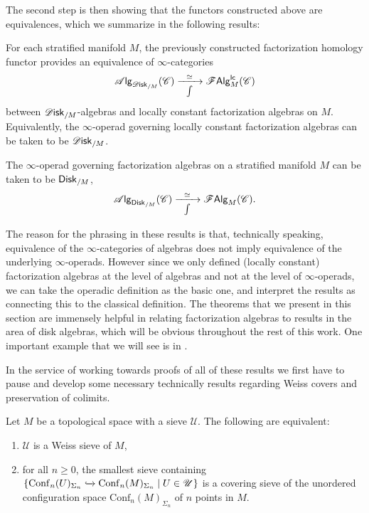 \documentclass[../text]{subfiles}
\begin{document}
The second step is then showing that the functors constructed above are equivalences, which we summarize in the following results:
%
\begin{theorem}\label{thm:disk_alg=lcfa}
    For each stratified manifold $M$, the previously constructed factorization homology functor provides an equivalence of $\infty$-categories
    \begin{equation}
        \alg{\disk_{/M}} (\catC) \xrightarrow[\int]{\ \ \simeq \ \ } \lcfa_M (\catC)
    \end{equation}
    between $\disk_{/M}$-algebras and locally constant factorization algebras on $M$. Equivalently, the $\infty$-operad governing locally constant factorization algebras can be taken to be $\disk_{/M}$.
\end{theorem}
%
\begin{corollary}\label{cor:disk_alg=falg}
    The $\infty$-operad governing factorization algebras on a stratified manifold $M$ can be taken to be $\disk[r]_{/M}$,
    \begin{equation}
        \alg{\disk[r]_{/M}} (\catC) \xrightarrow[\int]{\ \ \simeq \ \ } \falg_M (\catC).
    \end{equation}
\end{corollary}
%
The reason for the phrasing in these results is that, technically speaking, equivalence of the $\infty$-categories of algebras does not imply equivalence of the underlying $\infty$-operads. However since we only defined (locally constant) factorization algebras at the level of algebras and not at the level of $\infty$-operads, we can take the operadic definition as the basic one, and interpret the results as connecting this to the classical definition. The theorems that we present in this section are immensely helpful in relating factorization algebras to results in the area of disk algebras, which will be obvious throughout the rest of this work. One important example that we will see is in .

In the service of working towards proofs of all of these results we first have to pause and develop some necessary technically results regarding Weiss covers and preservation of colimits.

\begin{lemma}\label{lem:weiss_to_ordinary}
    Let $M$ be a topological space with a sieve $\mathscr{U}$. The following are equivalent:
    \begin{enumerate}
        \item $\mathscr{U}$ is a Weiss sieve of $M$,
        \item for all $n \geq 0$, the smallest sieve containing $\{ \mathrm{Conf}_n(U)_{\Sigma_n} \xhookrightarrow{} \mathrm{Conf}_n(M)_{\Sigma_n} \mid U \in \mathscr{U} \}$ is a covering sieve of the unordered configuration space $\mathrm{Conf}_n(M)_{\Sigma_n}$ of $n$ points in $M$.
    \end{enumerate}
\end{lemma}
\end{document}
